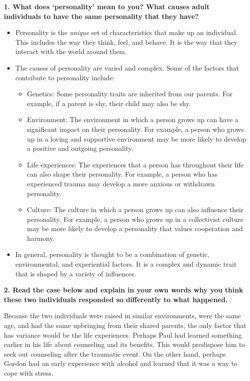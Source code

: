 \begin{center}
    \textbf{1. What does `personality' mean to you? What causes adult individuals to have the same personality that they have?}
\end{center}

\begin{itemize}
    \item Personality is the \textit{unique} set of characteristics that make up an individual. This includes the way they think, feel, and behave. It is the way that they interact with the world around them.
    \item The causes of personality are varied and complex. Some of the factors that contribute to personality include:
    \begin{itemize}
        \item Genetics: Some personality traits are inherited from our parents. For example, if a parent is shy, their child may also be shy.
        \item Environment: The environment in which a person grows up can have a significant impact on their personality. For example, a person who grows up in a loving and supportive environment may be more likely to develop a positive and outgoing personality.
        \item Life experiences: The experiences that a person has throughout their life can also shape their personality. For example, a person who has experienced trauma may develop a more anxious or withdrawn personality.
        \item Culture: The culture in which a person grows up can also influence their personality. For example, a person who grows up in a collectivist culture may be more likely to develop a personality that values cooperation and harmony.
    \end{itemize}
    \item In general, personality is thought to be a combination of genetic, environmental, and experiential factors. It is a complex and dynamic trait that is shaped by a variety of influences.
\end{itemize}

\begin{center}
    \textbf{2. Read the case below and explain in your own words why you think these two individuals responded so differently to what happened.}
\end{center}

Because the two individuals were raised in similar environments, were the same age, and had the same upbringing from their shared parents, the only factor that has variance would be the life experiences. Perhaps Paul had learned something earlier in his life about counseling and its benefits. This would predispose him to seek out counseling after the traumatic event. On the other hand, perhaps Gordon had an early experience with alcohol and learned that it was a way to cope with stress. 

